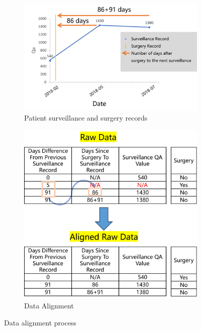 \begin{figure}[H]
    \centering
    \begin{subfigure}[b]{0.5\textwidth}
        \centering
        \includegraphics[width=\linewidth]{figures/Patient surveillance and surgery records.png}
        \caption{Patient surveillance and surgery records}
        \label{fig:vascular-access}
    \end{subfigure}%
    \hfill
    \begin{subfigure}[b]{0.4\textwidth}
        \centering
        \includegraphics[width=\linewidth]{figures/Data Alignment.png}
        \caption{Data Alignment}
        \label{fig:pta-symptom}
    \end{subfigure}
    \caption{Data alignment process}
    \label{fig:combined}
\end{figure}

